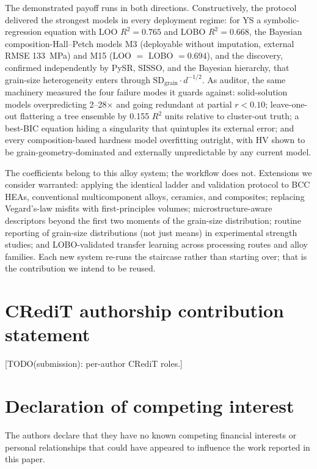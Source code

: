 \documentclass[5p,times,twocolumn]{elsarticle}
\begin{document}
The demonstrated payoff runs in both directions. Constructively, the protocol delivered the strongest models in every deployment regime: for YS a symbolic-regression equation with LOO $R^2 = 0.765$ and LOBO $R^2 = 0.668$, the Bayesian composition-Hall--Petch models M3 (deployable without imputation, external RMSE 133~\si{MPa}) and M15 (LOO $=$ LOBO $= 0.694$), and the discovery, confirmed independently by PySR, SISSO, and the Bayesian hierarchy, that grain-size heterogeneity enters through $\text{SD}_\text{grain}\cdot d^{-1/2}$. As auditor, the same machinery measured the four failure modes it guards against: solid-solution models overpredicting 2--28$\times$ and going redundant at partial $r < 0.10$; leave-one-out flattering a tree ensemble by 0.155 $R^2$ units relative to cluster-out truth; a best-BIC equation hiding a singularity that quintuples its external error; and every composition-based hardness model overfitting outright, with HV shown to be grain-geometry-dominated and externally unpredictable by any current model.

The coefficients belong to this alloy system; the workflow does not. Extensions we consider warranted: applying the identical ladder and validation protocol to BCC HEAs, conventional multicomponent alloys, ceramics, and composites; replacing Vegard's-law misfits with first-principles volumes; microstructure-aware descriptors beyond the first two moments of the grain-size distribution; routine reporting of grain-size distributions (not just means) in experimental strength studies; and LOBO-validated transfer learning across processing routes and alloy families. Each new system re-runs the staircase rather than starting over; that is the contribution we intend to be reused.



\section*{CRediT authorship contribution statement}

[TODO(submission): per-author CRediT roles.]

\section*{Declaration of competing interest}

The authors declare that they have no known competing financial interests or personal relationships that could have appeared to influence the work reported in this paper.
\end{document}
